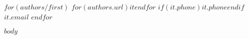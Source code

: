 \documentclass[letterpaper,11pt]{article} %
\makeatletter
\newcommand{\resumeHeading}[6]{
    \StrSubstitute{#3}{https://github.com/}{}[\github]
    \StrSubstitute{#4}{https://www.linkedin.com/in/}{}[\linkedin]
    \begin{center}
        \color{SeparatorPink}\transparent{0.5}
        \rule{0.9\textwidth}{1pt}\\
        \vspace{1pt}
        \color{HeaderBrown}\transparent{1.0}
        \href{#2}{\timesnewroman\Large\addfontfeatures{LetterSpace=15}\MakeUppercase{#1}} \\
        \vspace{5pt}
        {
            \avenirnext\small
            {Github: \href{#3}{\uline{@\github}}}\hspace{2pt}
            {LinkedIn: \href{#4}{\uline{@\linkedin}}}\hspace{2pt}
            \ifthenelse{\isempty{#5}}{}{#5\hspace{2pt}} %
            {\href{mailto:#6}{\uline{#6}}}
        }
        \color{SeparatorPink}\transparent{0.5}
        \rule{0.9\textwidth}{3pt}
    \end{center}
}
\makeatother
\begin{document}
\normalsize %

$for(authors/first)$
$for(authors.url)${$it$}$endfor$
{$if(it.phone)$$it.phone$$endif$}{$it.email$}
$endfor$

$body$
\end{document}
